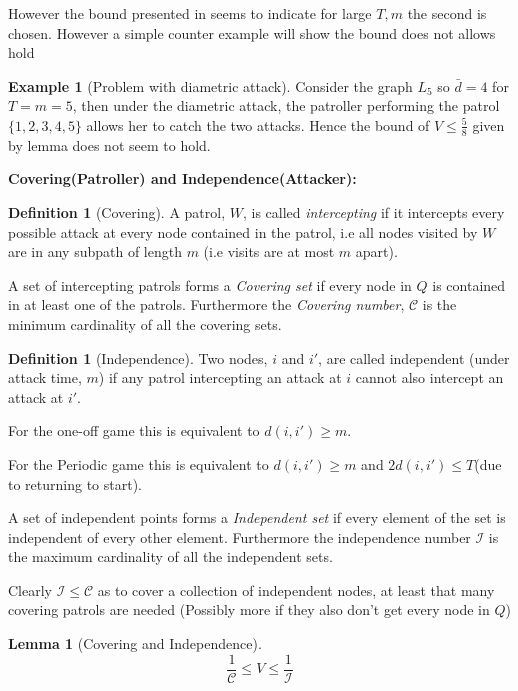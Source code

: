 \documentclass[a4paper,10pt]{article}
\newtheorem{lemma}[theorem]{Lemma}
\theoremstyle{definition}
\newtheorem{definition}[theorem]{Definition}
\theoremstyle{definition}
\newtheorem{example}[theorem]{Example}
\theoremstyle{remark}
\theoremstyle{definition}
\begin{document}
However the bound presented in \citep{Alpern2011} seems to indicate for large $T,m$ the second is chosen. However a simple counter example will show the bound does not allows hold
\begin{example}[Problem with diametric attack]
\label{example:counterexamplediamater} 
Consider the graph $L_{5}$ so $\bar{d}=4$ for $T=m=5$, then under the diametric attack, the patroller performing the patrol $\{ 1,2,3,4,5 \}$ allows her to catch the two attacks. Hence the bound of $V \leq \frac{5}{8}$ given by lemma does not seem to hold. 
\end{example}



\textbf{Covering(Patroller) and Independence(Attacker):}

\begin{definition}[Covering]
A patrol, $W$, is called \textit{intercepting} if it intercepts every possible attack at every node contained in the patrol, i.e all nodes visited by $W$ are in any subpath of length $m$ (i.e visits are at most $m$ apart).

A set of intercepting patrols forms a \textit{Covering set} if every node in $Q$ is contained in at least one of the patrols. Furthermore the \textit{Covering number}, $\mathcal{C}$ is the minimum cardinality of all the covering sets.
\end{definition}

\begin{definition}[Independence]
Two nodes, $i$ and $i'$, are called independent (under attack time, $m$) if any patrol intercepting an attack at $i$ cannot also intercept an attack at $i'$.

For the one-off game this is equivalent to $d(i,i') \geq m$.

For the Periodic game this is equivalent to $d(i,i') \geq m$ and $2d(i,i') \leq T$(due to returning to start).

A set of independent points forms a \textit{Independent set} if every element of the set is independent of every other element. Furthermore the independence number $\mathcal{I}$ is the maximum cardinality of all the independent sets.
\end{definition}

Clearly $\mathcal{I} \leq \mathcal{C}$ as to cover a collection of independent nodes, at least that many covering patrols are needed (Possibly more if they also don't get every node in $Q$)

\begin{lemma}[Covering and Independence]
$$ \frac{1}{\mathcal{C}} \leq V \leq \frac{1}{\mathcal{I}} $$
\end{lemma}
\end{document}
